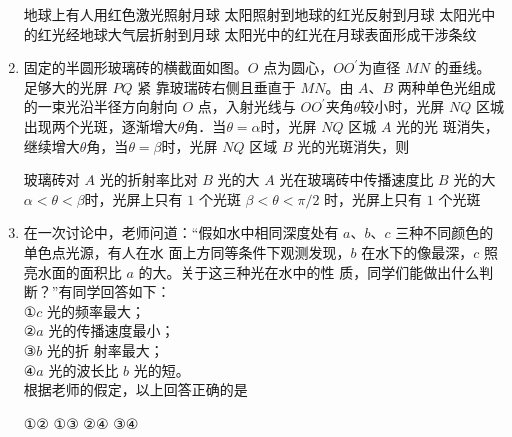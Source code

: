 \begin{enumerate}
\fourchoices
{地球上有人用红色激光照射月球}
{太阳照射到地球的红光反射到月球}
{太阳光中的红光经地球大气层折射到月球}
{太阳光中的红光在月球表面形成干涉条纹}


\item 
{}
固定的半圆形玻璃砖的横截面如图。$ O $ 点为圆心，$ OO ^{\prime} $为直径 $ MN $ 的垂线。足够大的光屏 $ PQ $ 紧
靠玻瑞砖右侧且垂直于 $ MN $。由 $ A $、$ B $ 两种单色光组成的一束光沿半径方向射向 $ O $ 点，入射光线与
$ OO ^{\prime} $夹角$ \theta $较小时，光屏 $ NQ $ 区城出现两个光斑，逐渐增大$ \theta $角．当$ \theta = \alpha $时，光屏 $ NQ $ 区城 $ A $ 光的光
斑消失，继续增大$ \theta $角，当$ \theta = \beta $时，光屏 $ NQ $ 区域 $ B $ 光的光斑消失，则  
\begin{figure}[h!]
	\centering
	
\end{figure}

\fourchoices
{玻璃砖对 $ A $ 光的折射率比对 $ B $ 光的大}
{$ A $ 光在玻璃砖中传播速度比 $ B $ 光的大}
{$ \alpha < \theta < \beta $时，光屏上只有 $ 1 $ 个光斑}
{$ \beta < \theta < \pi /2 $ 时，光屏上只有 $ 1 $ 个光斑}

\item 
{}
在一次讨论中，老师问道：“假如水中相同深度处有 $ a $、$ b $、$ c $ 三种不同颜色的单色点光源，有人在水
面上方同等条件下观测发现，$ b $ 在水下的像最深，$ c $ 照亮水面的面积比 $ a $ 的大。关于这三种光在水中的性
质，同学们能做出什么判断？”有同学回答如下：\\
①$ c $ 光的频率最大；\\②$ a $ 光的传播速度最小；\\③$ b $ 光的折
射率最大；\\④$ a $ 光的波长比 $ b $ 光的短。\\ 
根据老师的假定，以上回答正确的是  

\fourchoices
{①②}
{①③}
{②④}
{③④}


	
	
\end{enumerate}

